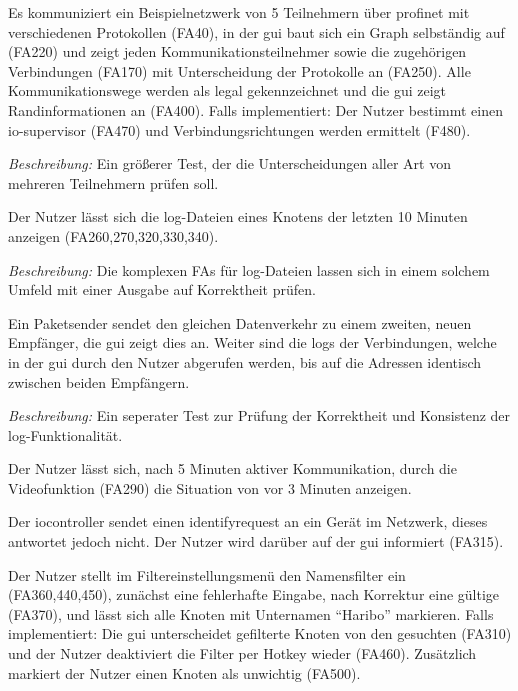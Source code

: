 \begin{description}[style=multiline, leftmargin=4cm, labelwidth=4cm]
  \item[\namedlabel{normalWatch}{Normale Netzwerküberwachung}] Es kommuniziert ein Beispielnetzwerk von 5 Teilnehmern über \gls{profinet} mit verschiedenen Protokollen (FA40), in der \gls{gui} baut sich ein Graph selbständig auf (FA220) und zeigt jeden Kommunikationsteilnehmer sowie die zugehörigen Verbindungen (FA170) mit Unterscheidung der Protokolle an (FA250). Alle Kommunikationswege werden als legal gekennzeichnet und die \gls{gui} zeigt Randinformationen an (FA400). Falls implementiert: Der Nutzer bestimmt einen \gls{io-supervisor} (FA470) und Verbindungsrichtungen werden ermittelt (F480). \par
      \textit{Beschreibung:} Ein größerer Test, der die Unterscheidungen aller Art von mehreren Teilnehmern prüfen soll.
  \item[\namedlabel{logs}{Log-Dateien anzeigen}] Der Nutzer lässt sich die \gls{log}-Dateien eines Knotens der letzten 10 Minuten anzeigen (FA260,270,320,330,340). \par
      \textit{Beschreibung:} Die komplexen FAs für \gls{log}-Dateien lassen sich in einem solchem Umfeld mit einer Ausgabe auf Korrektheit prüfen.
  \item[\namedlabel{guiDisplay}{Korrekte GUI Darstellung}] Ein Paketsender sendet den gleichen Datenverkehr zu einem zweiten, neuen Empfänger, die \gls{gui} zeigt dies an. Weiter sind die \glspl{log} der Verbindungen, welche in der \gls{gui} durch den Nutzer abgerufen werden, bis auf die Adressen identisch zwischen beiden Empfängern. \par
      \textit{Beschreibung:} Ein seperater Test zur Prüfung der Korrektheit und Konsistenz der \gls{log}-Funktionalität.
  \item[\namedlabel{video}{Rückverfolgung (optional)}] Der Nutzer lässt sich, nach 5 Minuten aktiver Kommunikation, durch die Videofunktion (FA290) die Situation von vor 3 Minuten anzeigen.
  \item[\namedlabel{timeout}{Timeoutbenachrichtigung (optional)}] Der \gls{iocontroller} sendet einen \gls{identifyrequest} an ein Gerät im Netzwerk, dieses antwortet jedoch nicht. Der Nutzer wird darüber auf der \gls{gui} informiert (FA315).
  \item[\namedlabel{filter}{Filter anwenden (optional)}] Der Nutzer stellt im Filtereinstellungsmenü den Namensfilter ein (FA360,440,450), zunächst eine fehlerhafte Eingabe, nach Korrektur eine gültige (FA370), und lässt sich alle Knoten mit Unternamen “Haribo” markieren. Falls implementiert: Die \gls{gui} unterscheidet gefilterte Knoten von den gesuchten (FA310) und der Nutzer deaktiviert die Filter per Hotkey wieder (FA460). Zusätzlich markiert der Nutzer einen Knoten als unwichtig (FA500).

\end{description}
